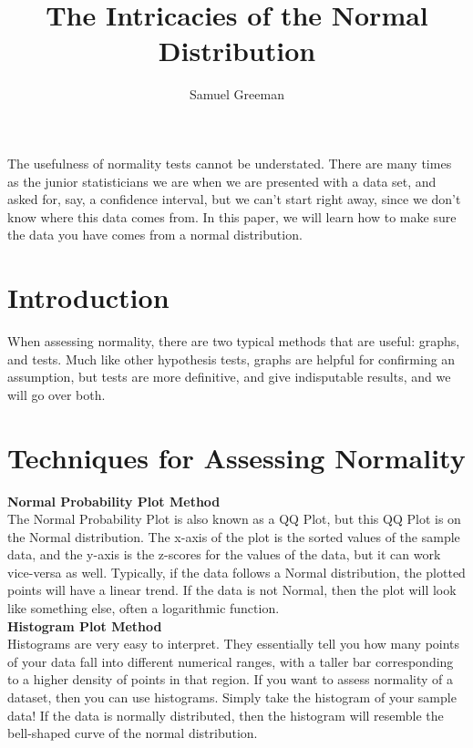\documentclass[12pt]{article}
\title{The Intricacies of the Normal Distribution}
\author{Samuel Greeman}
\date{}
\begin{document}
\maketitle
\begin{flushleft}




\setdefaultleftmargin{0pt}{}{}{}{}{}
The usefulness of normality tests cannot be understated. There are many times as the junior statisticians we are when we are presented with a data set, and asked for, say, a confidence interval, but we can't start right away, since we don't know where this data comes from. In this paper, we will learn how to make sure the data you have comes from a normal distribution.\\

\section{Introduction}\label{sec:intro}
When assessing normality, there are two typical methods that are useful: graphs, and tests. Much like other hypothesis tests, graphs are helpful for confirming an assumption, but tests are more definitive, and give indisputable results, and we will go over both.\\


\section{Techniques for Assessing Normality}\label{sec:chapter}
\textbf{Normal Probability Plot Method}\\
The Normal Probability Plot is also known as a QQ Plot, but this QQ Plot is on the Normal distribution. The x-axis of the plot is the sorted values of the sample data, and the y-axis is the z-scores for the values of the data, but it can work vice-versa as well. Typically, if the data follows a Normal distribution, the plotted points will have a linear trend. If the data is not Normal, then the plot will look like something else, often a logarithmic function.\\



\textbf{Histogram Plot Method}\\
Histograms are very easy to interpret. They essentially tell you how many points of your data fall into different numerical ranges, with a taller bar corresponding to a higher density of points in that region. If you want to assess normality of a dataset, then you can use histograms. Simply take the histogram of your sample data! If the data is normally distributed, then the histogram will resemble the bell-shaped curve of the normal distribution.\\


\end{flushleft}
\end{document}
